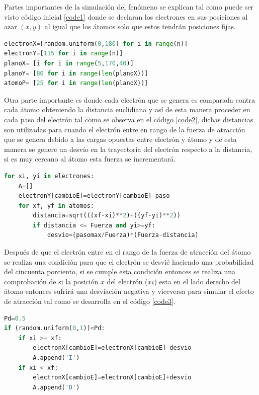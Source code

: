 \documentclass[3pt,twocolumn]{elsarticle}
\begin{document}
Partes importantes de la simulación del fenómeno se explican tal como puede ser visto código inicial \ref{code1} donde se declaran los electrones en sus posiciones al azar $(x,y)$ al igual que los átomos  solo que estos tendrán posiciones fijas.

\begin{lstlisting}[language=Python, caption=Declaración de electrones y átomos., label=code1]
electronX=[random.uniform(0,180) for i in range(n)]
electronY=[115 for i in range(n)]
planoX= [i for i in range(5,170,40)]
planoY= [80 for i in range(len(planoX))]
atomoP= [25 for i in range(len(planoX))]
\end{lstlisting}

Otra parte importante es donde cada electrón que se genera es comparada contra cada átomo obteniendo la distancia euclidiana y así de esta manera proceder en cada paso del electrón tal como se observa en el código \ref{code2}, dichas distancias son utilizadas para cuando el electrón entre en rango de la fuerza de atracción que se genera debido a las cargas opuestas entre electrón y átomo y de esta manera se genere un desvío en la trayectoria del electrón respecto a la distancia, si es muy cercano al átomo esta fuerza se incrementará.

\begin{lstlisting}[language=Python,caption=Distancia entre electron y átomo., label=code2] 
for xi, yi in electrones:
    A=[]
    electronY[cambioE]=electronY[cambioE]-paso
    for xf, yf in atomos: 
        distancia=sqrt(((xf-xi)**2)+((yf-yi)**2))
        if distancia <= Fuerza and yi>=yf:
            desvio=(pasomax/Fuerza)*(Fuerza-distancia)
\end{lstlisting}

Después de que el electrón entre en el rango de la fuerza de atracción del átomo se realiza una condición para que el electrón se desvié haciendo una probabilidad del cincuenta porciento, si se cumple esta condición entonces se realiza una comprobación de si la posición $x$ del electrón ($xi$) esta en el lado derecho del átomo entonces sufrirá una desviación negativa y viceversa para simular el efecto de atracción tal como se desarrolla en el código \ref{code3}. 
\begin{lstlisting}[language=Python,caption=Probabilidad y direccion del desvió., label=code3]
Pd=0.5
if (random.uniform(0,1))<Pd:
    if xi >= xf:
        electronX[cambioE]=electronX[cambioE]-desvio
        A.append('I')
    if xi < xf:
        electronX[cambioE]=electronX[cambioE]+desvio
        A.append('D')
\end{lstlisting}
\end{document}
